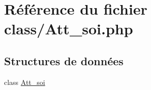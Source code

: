 \hypertarget{_att__soi_8php}{}\section{Référence du fichier class/\+Att\+\_\+soi.php}
\label{_att__soi_8php}
\subsection*{Structures de données}
\begin{DoxyCompactItemize}
\item 
class \mbox{\hyperlink{class_att__soi}{Att\+\_\+soi}}
\end{DoxyCompactItemize}

